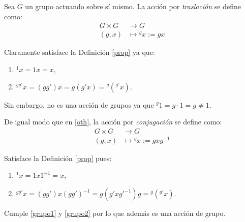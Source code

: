 \begin{Ejemplo} \label{oth}
Sea $G$ un grupo actuando sobre sí mismo. La acción por \textit{traslación} se define como:
    \begin{align*}
         G\times G & \rightarrow G \\
        (g,x) & \mapsto {}^gx := gx
    \end{align*}
    
Claramente satisface la Definición \ref{prop} ya que:
\begin{enumerate}
    \item ${}^1x = 1x= x $,  
    \item ${}^{gg'}x = (gg')x = g(g'x) = {}^{g}({}^{g'}x) $.
\end{enumerate}  
Sin embargo, no es una acción de grupos ya que ${}^g1 = g\cdot1=g \not = 1$.
\end{Ejemplo}    



\begin{Ejemplo}
De igual modo que en \ref{oth}, la acción por \textit{conjugación} se define como:
    \begin{align*}
         G\times G & \rightarrow G \\
        (g,x) & \mapsto {}^gx := gxg^{-1}
    \end{align*}
    
Satisface la Definición \ref{prop} pues:
\begin{enumerate}
    \item ${}^1x = 1x1^{-1}=x $,
    \item  ${}^{gg'}x = (gg')x(gg')^{-1}=    g(g'xg'^{-1})g = {}^{g}({}^{g'}x) $.
\end{enumerate}  

Cumple \ref{grupo1} y \ref{grupo2} por lo que además es una acción de grupo.
\end{Ejemplo}  
    

%    











